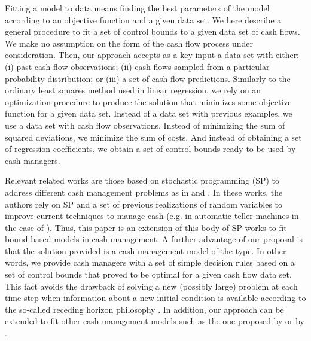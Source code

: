 Fitting a model to data means finding the best parameters of the model according to an objective function and a given data set. We here describe a general procedure to fit a set of control bounds to a given data set of cash flows. We make no assumption on the form of the cash flow process under consideration. Then, our approach accepts as a key input a data set with either: (i) past cash flow observations; (ii) cash flows sampled from a particular probability distribution; or (iii) a set of cash flow predictions. Similarly to the ordinary least squares method used in linear regression, we rely on an optimization procedure to produce the solution that minimizes some objective function for a given data set. Instead of a data set with previous examples, we use a data set with cash flow observations. Instead of minimizing the sum of squared deviations, we minimize the sum of costs. And instead of obtaining a set of regression coefficients, we obtain a set of control bounds ready to be used by cash managers. 

Relevant related works are those based on stochastic programming (SP) to address different cash management problems as in \cite{golub1995stochastic,gardin1995liquidity,gondzio2001high} and \cite{castro2009stochastic}. In these works, the authors rely on SP and a set of previous realizations of random variables to improve current techniques to manage cash (e.g. in automatic teller machines in the case of \cite{castro2009stochastic}). Thus, this paper is an extension of this body of SP works to fit bound-based models in cash management. A further advantage of our proposal is that the solution provided is a cash management model of the \cite{miller1966model} type. In other words, we provide cash managers with a set of simple decision rules based on a set of control bounds that proved to be optimal for a given cash flow data set. This fact avoids the drawback of solving a new (possibly large) problem at each time step when information about a new initial condition is available according to the so-called receding horizon philosophy \citep{bemporad1999control,camacho2007model}. In addition, our approach can be extended to fit other cash management models such as the one proposed by \cite{stone1972use} or by \cite{gormley2007utility}.


